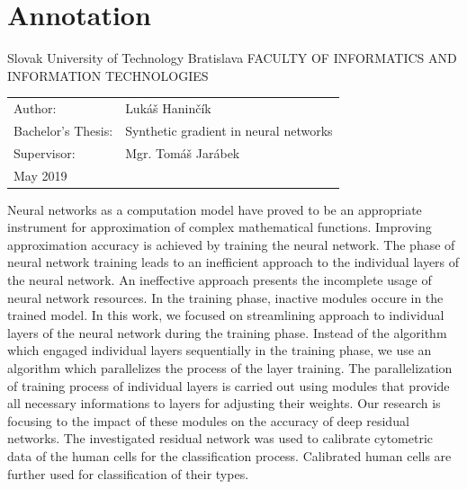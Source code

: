 \documentclass[12pt, twoside]{book}
\newcommand{\itab}[1]{\hspace{0em}\rlap{#1}}
\newcommand{\tab}[1]{\hspace{.31\textwidth}\rlap{#1}}
\begin{document}


\newpage 
\afterpage{\null\thispagestyle{empty}\newpage}
\section*{Annotation}
Slovak University of Technology Bratislava
\newline
FACULTY OF INFORMATICS AND INFORMATION TECHNOLOGIES
\newline
\itab{Degree course:}    \tab{Informatics}
\begin{table}[h!]
\renewcommand{\arraystretch}{1.4}
\begin{tabular}{@{}p{45mm}l}
Author: & Lukáš Haninčík \\
Bachelor’s Thesis: & Synthetic gradient in neural networks \\
Supervisor: & Mgr. Tomáš Jarábek \\
May 2019
\end{tabular}
\end{table}
\newline
\newline
Neural networks as a computation model have proved to be an appropriate instrument for approximation of complex mathematical functions. Improving approximation accuracy is achieved by training the neural network. The phase of neural network training leads to an inefficient approach to the individual layers of the neural network. An ineffective approach presents the incomplete usage of neural network resources. In the training phase, inactive modules occure in the trained model. In this work, we focused on streamlining approach to individual layers of the neural network during the training phase. Instead of the algorithm which engaged individual layers sequentially in the training phase, we use an algorithm which parallelizes the process of the layer training. The parallelization of training process of individual layers is carried out using modules that provide all necessary informations to layers for adjusting their weights. Our research is focusing to the impact of these modules on the accuracy of deep residual networks. The investigated residual network was used to calibrate cytometric data of the human cells for the classification process. Calibrated human cells are further used for classification of their types.
\end{document}
